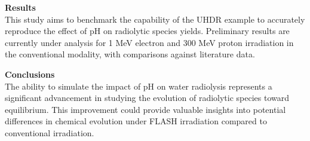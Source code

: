 \documentclass[12pt,lettersize,oneside]{book} %
\begin{document}
\begin{talk}
\textbf{Results}\\
This study aims to benchmark the capability of the UHDR example to accurately reproduce the effect of pH on radiolytic species yields. Preliminary results are currently under analysis for 1 MeV electron and 300 MeV proton irradiation in the conventional modality, with comparisons against literature data.

\textbf{Conclusions}\\
The ability to simulate the impact of pH on water radiolysis represents a significant advancement in studying the evolution of radiolytic species toward equilibrium. This improvement could provide valuable insights into potential differences in chemical evolution under FLASH irradiation compared to conventional irradiation.


\medskip



\end{talk}
\end{document}
